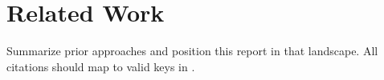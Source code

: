 ﻿\section{Related Work}

Summarize prior approaches and position this report in that landscape.
All citations should map to valid keys in .
